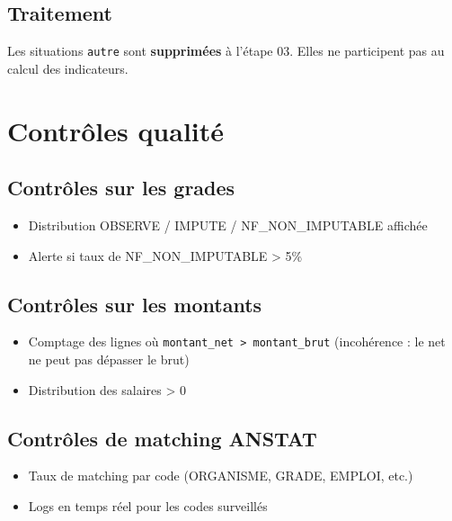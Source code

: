 \documentclass[12pt,a4paper,french]{article}
\begin{document}
\subsection{Traitement}

Les situations \texttt{autre} sont \textbf{supprimées} à l'étape 03.
Elles ne participent pas au calcul des indicateurs.

\section{Contrôles qualité}

\subsection{Contrôles sur les grades}

\begin{itemize}
    \item Distribution OBSERVE / IMPUTE / NF\_NON\_IMPUTABLE affichée
    \item Alerte si taux de NF\_NON\_IMPUTABLE > 5\%
\end{itemize}

\subsection{Contrôles sur les montants}

\begin{itemize}
    \item Comptage des lignes où \texttt{montant\_net > montant\_brut}
          (incohérence : le net ne peut pas dépasser le brut)
    \item Distribution des salaires > 0
\end{itemize}

\subsection{Contrôles de matching ANSTAT}

\begin{itemize}
    \item Taux de matching par code (ORGANISME, GRADE, EMPLOI, etc.)
    \item Logs en temps réel pour les codes surveillés
\end{itemize}

\end{document}
